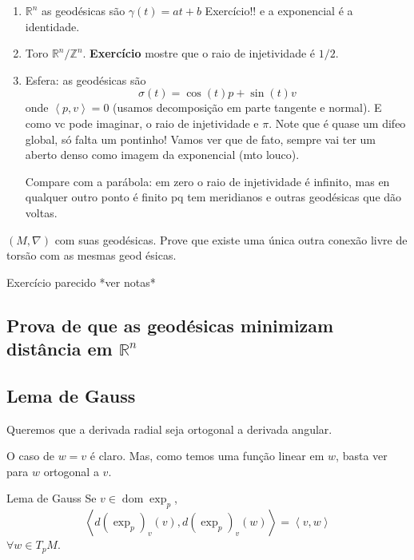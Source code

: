 \begin{enumerate}
\item \(\mathbb{R}^n\) as geodésicas são \(\gamma(t)=at+b\) {\color{2}Exercício!!} e a exponencial é a identidade.
\item Toro  \(\mathbb{R}^n/\mathbb{Z}^n\). \textbf{Exercício} mostre que o raio de injetividade é \(1/2\).
\item Esfera: as geodésicas são
	\[\sigma(t)=\cos (t)p+\sin (t)v\]
onde \(\left<p,v\right>=0\) (usamos decomposição em parte tangente e normal). E como vc pode imaginar, o raio de injetividade e \(\pi\). Note que é quase um difeo global, só falta um pontinho! Vamos ver que de fato, sempre vai ter um aberto denso como imagem da exponencial (mto louco).

\begin{remark}\leavevmode
Compare com a parábola: em zero o raio de injetividade é infinito, mas en qualquer outro ponto é finito pq tem meridianos e outras geodésicas que dão voltas.
\end{remark}
\end{enumerate}

\begin{exercise}\leavevmode
\((M,\nabla)\) com suas geodésicas. Prove que existe uma única outra conexão livre de torsão com as mesmas geod ésicas.
\end{exercise}

\begin{thing8}{Exercício parecido}\leavevmode
*ver notas*
\end{thing8}

\subsection{Prova de que as geodésicas minimizam distância em \(\mathbb{R}^n\)}

\subsection{Lema de Gauss}

Queremos que a derivada radial seja ortogonal a derivada angular.

\begin{upshot}\leavevmode
O caso de \(w=v\) é claro. Mas, como temos uma função linear em \(w\), basta ver para \(w\) ortogonal a \(v\).
\end{upshot}

\begin{thing8}{Lema de Gauss}\leavevmode
Se \(v \in \operatorname{dom} \operatorname{exp}_p\),
\[\left<d(\operatorname{exp}_p)_v(v),d(\operatorname{exp}_p)_v(w)\right>=\left<v,w\right>\]
\(\forall w \in T_pM\).
\end{thing8}

